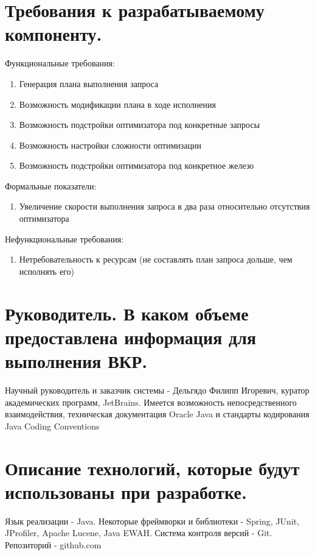 \documentclass[12pt]{article}
\begin{document}
    \section{Требования к разрабатываемому компоненту.}
        Функциональные требования:
        \begin{enumerate}\itemsep1pt \parskip0pt 
            \item Генерация плана выполнения запроса
            \item Возможность модификации плана в ходе исполнения
            \item Возможность подстройки оптимизатора под конкретные запросы
            \item Возможность настройки сложности оптимизации
            \item Возможность подстройки оптимизатора под конкретное железо
        \end{enumerate}
        
        Формальные показатели: %
        \begin{enumerate}\itemsep1pt \parskip0pt  
            \item Увеличение скорости выполнения запроса в два раза относительно отсутствия оптимизатора
        \end{enumerate}
        
        Нефункциональные требования: %
        \begin{enumerate}\itemsep1pt \parskip0pt  
            \item Нетребовательность к ресурсам (не составлять план запроса дольше, чем исполнять его)
        \end{enumerate}
    \section{Руководитель. В каком объеме предоставлена информация для выполнения ВКР.}
    	Научный руководитель и заказчик системы - Дельгядо Филипп Игоревич, куратор академических программ, JetBrains. Имеется возможность непосредственного взаимодействия, техническая документация Oracle Java и стандарты кодирования Java Coding Conventions
    \section{Описание технологий, которые будут использованы при разработке.}
        Язык реализации - Java. Некоторые фреймворки и библиотеки - Spring, JUnit, JProfiler, Apache Lucene, Java EWAH. Система контроля версий - Git. Репозиторий - github.com 
\end{document}
